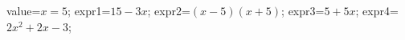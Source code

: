 \documentclass[exercice]{thedocument}%
\begin{document}
%
\>value=$x=5$;%
\>expr1=$15-3x$;%
\>expr2=$(x-5)(x+5)$;%
\>expr3=$5+5x$;%
\>expr4=$2x^2+2x-3$;%
%
\end{document}
